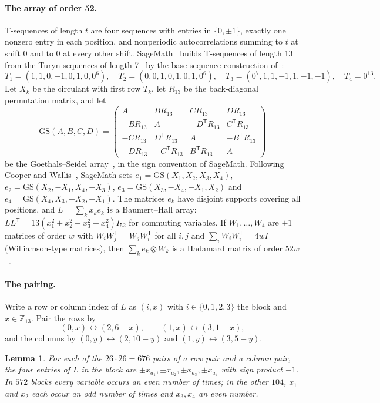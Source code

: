 \documentclass[10pt]{article}
\newtheorem{lemma}[theorem]{Lemma}
\theoremstyle{definition}
\theoremstyle{remark}
\newcommand{\tr}{^{\mathsf T}}
\begin{document}
\paragraph{The array of order 52.} T-sequences of length $t$ are four sequences with entries in $\{0,\pm1\}$, exactly one nonzero entry in each position, and nonperiodic autocorrelations summing to $t$ at shift $0$ and to $0$ at every other shift. SageMath~\cite{Sage} builds T-sequences of length 13 from the Turyn sequences of length 7~\cite{Tu74} by the base-sequence construction of~\cite{KTR05}:
\[
T_1=(1,1,0,-1,0,1,0,0^6),\quad T_2=(0,0,1,0,1,0,1,0^6),\quad T_3=(0^7,1,1,-1,1,-1,-1),\quad T_4=0^{13}.
\]
Let $X_k$ be the circulant with first row $T_k$, let $R_{13}$ be the back-diagonal permutation matrix, and let
\[
\mathrm{GS}(A,B,C,D)=\begin{pmatrix}A&BR_{13}&CR_{13}&DR_{13}\\-BR_{13}&A&-D\tr R_{13}&C\tr R_{13}\\-CR_{13}&D\tr R_{13}&A&-B\tr R_{13}\\-DR_{13}&-C\tr R_{13}&B\tr R_{13}&A\end{pmatrix}
\]
be the Goethals--Seidel array~\cite{GS70}, in the sign convention of SageMath. Following Cooper and Wallis~\cite{CW72}, SageMath sets $e_1=\mathrm{GS}(X_1,X_2,X_3,X_4)$, $e_2=\mathrm{GS}(X_2,-X_1,X_4,-X_3)$, $e_3=\mathrm{GS}(X_3,-X_4,-X_1,X_2)$ and $e_4=\mathrm{GS}(X_4,X_3,-X_2,-X_1)$. The matrices $e_k$ have disjoint supports covering all positions, and $L=\sum_kx_ke_k$ is a Baumert--Hall array: $LL\tr=13(x_1^2+x_2^2+x_3^2+x_4^2)I_{52}$ for commuting variables. If $W_1,\dots,W_4$ are $\pm1$ matrices of order $w$ with $W_iW_j\tr=W_jW_i\tr$ for all $i,j$ and $\sum_iW_iW_i\tr=4wI$ (Williamson-type matrices), then $\sum_ke_k\otimes W_k$ is a Hadamard matrix of order $52w$~\cite{CW72}.

\paragraph{The pairing.} Write a row or column index of $L$ as $(i,x)$ with $i\in\{0,1,2,3\}$ the block and $x\in\mathbb Z_{13}$. Pair the rows by
\[
(0,x)\leftrightarrow(2,6-x),\qquad (1,x)\leftrightarrow(3,1-x),
\]
and the columns by $(0,y)\leftrightarrow(2,10-y)$ and $(1,y)\leftrightarrow(3,5-y)$.

\begin{lemma}\label{lem:pairing}
For each of the $26\cdot26=676$ pairs of a row pair and a column pair, the four entries of $L$ in the block are $\pm x_{a_1},\pm x_{a_2},\pm x_{a_3},\pm x_{a_4}$ with sign product $-1$. In $572$ blocks every variable occurs an even number of times; in the other $104$, $x_1$ and $x_2$ each occur an odd number of times and $x_3,x_4$ an even number.
\end{lemma}
\end{document}
